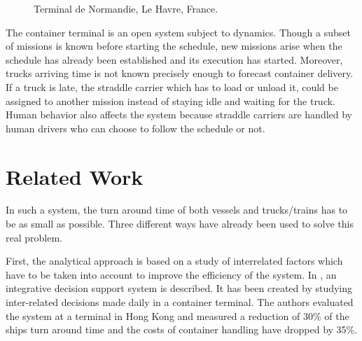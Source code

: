 \documentclass[journal]{IEEEtran}
\let\MYoriglatexcaption\caption
\renewcommand{\caption}[2][\relax]{\MYoriglatexcaption[#2]{#2}}
\begin{document}
\begin{figure}[h]
\caption[Terminal de Normandie, Le Havre, France]{Terminal de Normandie, Le
Havre, France\protect \footnotemark.}
\label{terminalDeNormandie}
\end{figure}

The container terminal is an open system subject to dynamics. Though a
subset of missions is known before starting the schedule, new missions arise when the schedule has already been established and its execution has started. Moreover, trucks
arriving time is not known precisely enough to forecast container delivery. If a truck is late, the straddle carrier which has to load or unload it, could be assigned to another mission instead of staying idle
and waiting for the truck. Human behavior also affects the system because straddle carriers are handled by human drivers who can choose to follow the schedule or not.


\section{Related Work}
In such a system, the turn around time of both vessels and trucks/trains has to
be as small as possible. Three different ways have already been used to solve
this real problem.

 First, the analytical approach is based on a study of interrelated factors
which have to be taken into account to improve the efficiency of the system. In \cite{murty2005}, an integrative decision support system is described. It has been created by studying inter-related decisions made daily in a container terminal. The authors evaluated the system at a terminal in Hong Kong and measured a reduction of 30\% of the ships turn around time and the costs of container handling have dropped by 35\%.
\end{document}

